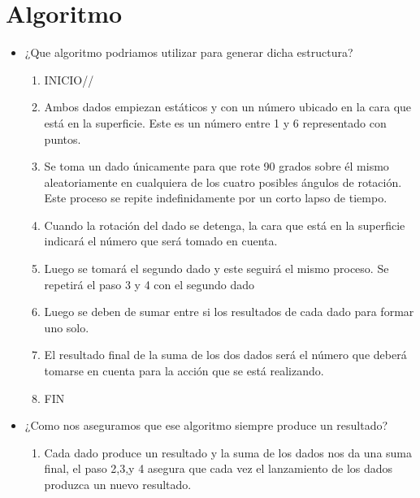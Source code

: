 \documentclass{article}
\begin{document}
\section{Algoritmo}
\begin{itemize}
        
        \item{¿Que algoritmo podriamos utilizar para generar dicha estructura?}
        

      
\begin{enumerate}
\item   INICIO//
\item          Ambos dados empiezan estáticos y con un número ubicado en la cara que está en la superficie. Este es un número entre  1 y 6 representado con puntos. \\
\item         Se toma un dado únicamente para que rote 90 grados sobre él mismo aleatoriamente en cualquiera de los cuatro posibles ángulos de rotación. Este proceso se repite indefinidamente por un corto lapso de tiempo. \\
\item         Cuando la rotación del dado se detenga, la cara que está en la superficie indicará el número que será tomado en cuenta.\\
\item         Luego se tomará el segundo dado y este seguirá el mismo proceso. Se repetirá el paso 3 y 4 con el segundo dado\\
\item         Luego se deben de sumar entre si los resultados de cada dado para formar uno solo.\\
\item         El resultado final de la suma de los dos dados será el número que deberá tomarse en cuenta para la acción que se está realizando.\\
\item         FIN\\
\end{enumerate}

        \item{¿Como nos aseguramos que ese algoritmo siempre produce un resultado?}\\
	
\begin{enumerate}
\item Cada dado produce un resultado y la suma de los dados nos da una suma final, el paso 2,3,y 4 asegura que cada vez el lanzamiento de los dados produzca un nuevo resultado.
\end{enumerate}
\end{itemize}
\end{document}
